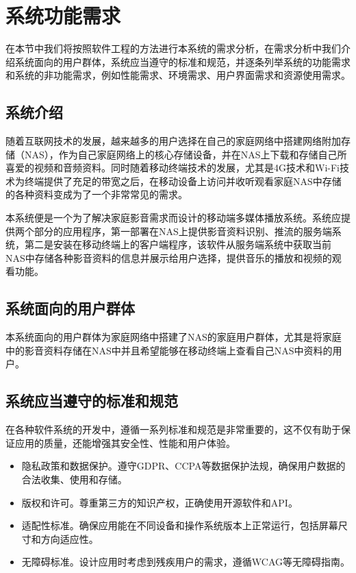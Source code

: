 \documentclass[main.tex]{subfiles}
\begin{document}
\section{系统功能需求}


在本节中我们将按照软件工程的方法进行本系统的需求分析，在需求分析中我们介绍系统面向的用户群体，系统应当遵守的标准和规范，并逐条列举系统的功能需求和系统的非功能需求，例如性能需求、环境需求、用户界面需求和资源使用需求。

\subsection{系统介绍}

随着互联网技术的发展，越来越多的用户选择在自己的家庭网络中搭建网络附加存储（NAS），作为自己家庭网络上的核心存储设备，并在NAS上下载和存储自己所喜爱的视频和音频资料。同时随着移动终端技术的发展，尤其是4G技术和Wi-Fi技术为终端提供了充足的带宽之后，在移动设备上访问并收听观看家庭NAS中存储的各种资料变成为了一个非常常见的需求。

本系统便是一个为了解决家庭影音需求而设计的移动端多媒体播放系统。系统应提供两个部分的应用程序，第一部署在NAS上提供影音资料识别、推流的服务端系统，第二是安装在移动终端上的客户端程序，该软件从服务端系统中获取当前NAS中存储各种影音资料的信息并展示给用户选择，提供音乐的播放和视频的观看功能。

\subsection{系统面向的用户群体}

本系统面向的用户群体为家庭网络中搭建了NAS的家庭用户群体，尤其是将家庭中的影音资料存储在NAS中并且希望能够在移动终端上查看自己NAS中资料的用户。

\subsection{系统应当遵守的标准和规范}

在各种软件系统的开发中，遵循一系列标准和规范是非常重要的，这不仅有助于保证应用的质量，还能增强其安全性、性能和用户体验。

\begin{itemize}
    \item 隐私政策和数据保护。遵守GDPR、CCPA等数据保护法规，确保用户数据的合法收集、使用和存储。
    \item 版权和许可。尊重第三方的知识产权，正确使用开源软件和API。
    \item 适配性标准。确保应用能在不同设备和操作系统版本上正常运行，包括屏幕尺寸和方向适应性。
    \item 无障碍标准。设计应用时考虑到残疾用户的需求，遵循WCAG等无障碍指南。
\end{itemize}
\end{document}
